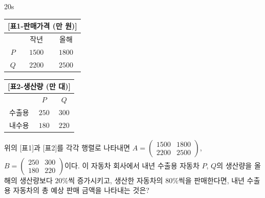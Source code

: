 \documentclass[10pt]{article}
\begin{document}
\begin{pagepair}
\begin{minipage}[t][\probboxheight][t]{0.46\linewidth}
\begin{problem}{20}{s}
\begin{center}
\small
\begin{tabular}{c|cc}
\multicolumn{3}{c}{[표1-판매가격 (만 원)]} \\ \hline
      & 작년 & 올해 \\ \hline
$P$   & $1500$ & $1800$ \\
$Q$   & $2200$ & $2500$
\end{tabular}
\quad
\begin{tabular}{c|cc}
\multicolumn{3}{c}{[표2-생산량 (만 대)]} \\ \hline
       & $P$    & $Q$    \\ \hline
수출용 & $250$  & $300$  \\
내수용 & $180$  & $220$
\end{tabular}
\end{center}

위의 [표1]과 [표2]를 각각 행렬로 나타내면 $A = \begin{pmatrix} 1500 & 1800 \\ 2200 & 2500 \end{pmatrix}$, $B = \begin{pmatrix} 250 & 300 \\ 180 & 220 \end{pmatrix}$이다. 이 자동차 회사에서 내년 수출용 자동차 $P$, $Q$의 생산량을 올해의 생산량보다 $20\%$씩 증가시키고, 생산한 자동차의 $80\%$씩을 판매한다면, 내년 수출용 자동차의 총 예상 판매 금액을 나타내는 것은? 
\begin{choices}
\end{choices}
\end{problem}
\end{minipage}
\end{pagepair}
\end{document}
